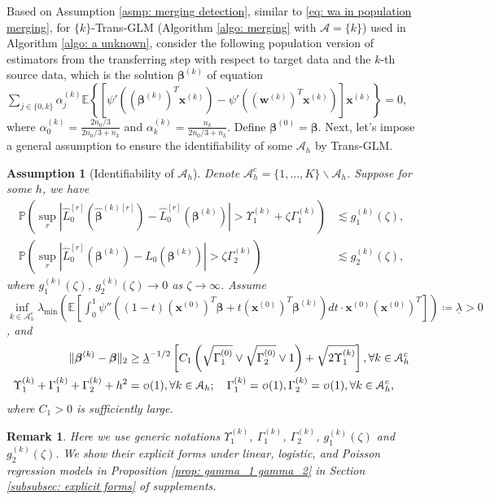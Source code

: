 \documentclass[12pt]{article}
\newcommand{\tp}{\mathbb{P}}
\newcommand{\te}{\mathbb{E}}
\newcommand{\twonorm}[1]{\|#1\|_{2}}
\newcommand{\norm}[1]{|#1|}
\newcommand{\bbeta}{\bm{\beta}}
\newcommand{\hbeta}{\hat{\bm{\beta}}}
\newcommand{\bbetak}[1]{\bm{\beta}^{(#1)}}
\newcommand{\bxk}[1]{\bm{x}^{(#1)}}
\newcommand{\bwk}[1]{\bm{w}^{(#1)}}
\newcommand{\ma}{\mathcal{A}}
\newcommand{\mah}{\mathcal{A}_h}
\newcommand{\mach}{\mathcal{A}^c_h}
\newcommand{\<}{\langle}
\renewcommand{\>}{\rangle}
\newcommand\smallo{
  \mathchoice
    {{\scriptstyle\mathcal{O}}}%
    {{\scriptstyle\mathcal{O}}}%
    {{\scriptscriptstyle\mathcal{O}}}%
    {\scalebox{.7}{$\scriptscriptstyle\mathcal{O}$}}%
}
\newtheorem{remark}{Remark}
\newtheorem{assumption}{Assumption}
\begin{document}
Based on Assumption \ref{asmp: merging detection}, similar to \eqref{eq: wa in population merging}, for $\{k\}$-Trans-GLM (Algorithm \ref{algo: merging} with $\ma = \{k\}$) used in Algorithm \ref{algo: a unknown}, consider the following population version of estimators from the transferring step with respect to target data and the $k$-th source data, which is the solution $\bbetak{k}$ of equation $\sum_{j\in\{0,k\}}\alpha_j^{(k)}\te\left\{[\psi'((\bbetak{k})^T\bxk{k})-\psi'((\bwk{k})^T\bxk{k})]\bxk{k}\right\} = 0$,
where $\alpha_0^{(k)} = \frac{2n_0/3}{2n_0/3 + n_k}$ and $\alpha_k^{(k)} = \frac{n_k}{2n_0/3 + n_k}$. Define $\bbetak{0} = \bbeta$. Next, let's impose a general assumption to ensure the identifiability of some $\mah$ by Trans-GLM.
\begin{assumption}[Identifiability of $\mah$]\label{asmp: idenfity a}
	Denote $\mach = \{1, \ldots,K\}\backslash \mah$. Suppose for some $h$, we have
	\begin{align}
		\tp\left(\sup_r\norm{\hat{L}_0^{[r]}(\hbeta^{(k)[r]}) - \hat{L}_0^{[r]}(\bbetak{k})} > \Upsilon_1^{(k)}+\zeta\Gamma_1^{(k)}\right) &\lesssim g_1^{(k)}(\zeta),\\ 
		 \tp\left(\sup_r\norm{\hat{L}_0^{[r]}(\bbetak{k}) -L_0(\bbetak{k})} > \zeta\Gamma_2^{(k)}\right) &\lesssim g_2^{(k)}(\zeta),
	\end{align}
	where $g_1^{(k)}(\zeta)$, $g_2^{(k)}(\zeta) \rightarrow 0$ as $\zeta \rightarrow \infty$.
	Assume $\inf\limits_{k \in \mach}\lambda_{\min}(\te[\int_0^1\psi''((1-t)(\bxk{0})^T\bbeta + t(\bxk{0})^T\bbetak{k})dt\cdot \bxk{0}(\bxk{0})^T]) \coloneqq \underline{\lambda} > 0$, and
	\begin{align}
		\twonorm{\bbetak{k} -\bbeta} &\geq \underline{\lambda}^{-1/2}\left[C_1\left(\sqrt{\Gamma_1^{(0)}}\vee \sqrt{\Gamma_2^{(0)}} \vee 1\right) + \sqrt{2\Upsilon_1^{(k)}}\right], \forall k \in \mach \label{eq: gap ac l0}\\
		\Upsilon_1^{(k)} + \Gamma_1^{(k)} + \Gamma_2^{(k)} + h^2 &= \smallo(1), \forall k \in \mah;\quad \Gamma_1^{(k)} = \smallo(1), \Gamma_2^{(k)} = \smallo(1), \forall k \in \mach, \label{eq: error term dominated}
	\end{align}
	where $C_1 > 0$ is sufficiently large.
\end{assumption}

\begin{remark}
	Here we use generic notations $\Upsilon_1^{(k)}$, $\Gamma_1^{(k)}$, $\Gamma_2^{(k)}$, $g_1^{(k)}(\zeta)$ and $g_2^{(k)}(\zeta)$. We show their explicit forms under linear, logistic, and Poisson regression models in Proposition \ref{prop: gamma_1 gamma_2} in Section \ref{subsubsec: explicit forms} of supplements.
\end{remark}
\end{document}
